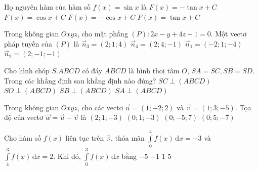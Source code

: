 \begin{ex}%
	Họ nguyên hàm của hàm số $f(x)=\sin x$ là
	\choice
	{$F(x)=-\tan x+C$}
	{$F(x)=\cos x+C$}
	{\True $F(x)=-\cos x+C$}
	{$F(x)=\tan x+C$}
\end{ex}

\begin{ex}%
	Trong không gian $Oxyz$, cho mặt phẳng $(P)\colon 2x-y+4z-1=0$. Một vectơ pháp tuyến của $(P)$ là
	\choice
	{$\vec{n}_3=(2;1;4)$}
	{$\vec{n}_4=(2;4;-1)$}
	{\True $\vec{n}_1=(-2;1;-4)$}
	{$\vec{n}_2=(2;-1;-1)$}
\end{ex}

\begin{ex}%
	Cho hình chóp $S.ABCD$ có đáy $ABCD$ là hình thoi tâm $O$, $SA=SC, SB=SD$. Trong các khẳng định sau khẳng định nào đúng?
	\choice
	{$SC \perp (ABCD)$}
	{\True $SO \perp (ABCD)$}
	{$SB \perp (ABCD)$}
	{$SA \perp (ABCD)$}
\end{ex}

\begin{ex}%
	Trong không gian $Oxyz$, cho các vectơ $\vec{u}=(1;-2;2)$ và $\vec{v}=(1;3;-5)$. Tọa độ của vectơ $\vec{w}=\vec{u}-\vec{v}$ là
	\choice
	{$(2;1;-3)$}
	{$(0;1;-3)$}
	{\True $(0;-5;7)$}
	{$(0;5;-7)$}
\end{ex}

\begin{ex}%
	Cho hàm số $f(x)$ liên tục trên $\mathbb{R}$, thỏa mãn $\displaystyle\int\limits_0^4 f(x)\mathrm{\,d}x=-3$ và $\displaystyle\int\limits_4^3 f(x)\mathrm{\,d}x=2$. Khi đó, $\displaystyle\int\limits_0^3 f(x)\mathrm{\,d}x$ bằng 
	\choice
	{$-5$}
	{\True $-1$}
	{$1$}
	{$5$}
\end{ex}

